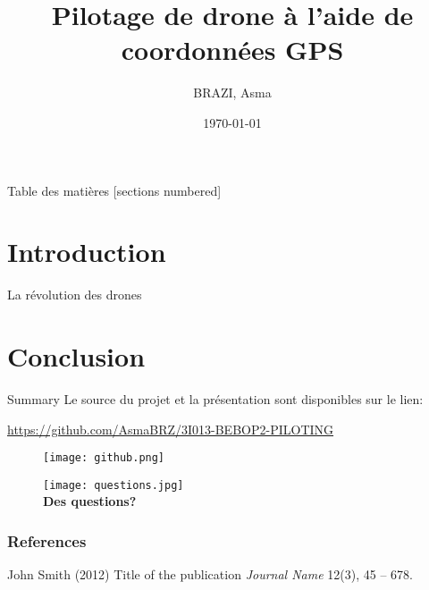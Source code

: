 \documentclass{beamer}
\title{Pilotage de drone à l'aide de coordonnées GPS}
\author{
  BRAZI, Asma\\
 
}
\institute{Sorbonne Université}
\date{\today}
\begin{document}
\maketitle

\begin{frame}{Table des matières}
  [sections numbered]
  \tableofcontents[hideallsubsections]
  
\end{frame}

\section{Introduction}

\begin{frame}[fragile]{La révolution des drones}
\end{frame}


\section{Conclusion}

\begin{frame}{Summary}
  Le source du projet et la présentation sont disponibles sur le lien:
  \begin{center}\url{https://github.com/AsmaBRZ/3I013-BEBOP2-PILOTING}\end{center}
 \begin{center}
 \begin{figure}
 \texttt{[image: github.png]}
 \end{figure}
 \end{center}

\end{frame}
\begin{frame}
\begin{figure}
 \texttt{[image: questions.jpg]}
 \\
 \textbf{Des questions?} 
\end{figure}
\end{frame}
\begin{frame}
\frametitle{References}
\footnotesize{
	\begin{thebibliography}{99} %
		 John Smith (2012)
		\newblock Title of the publication
		\newblock \emph{Journal Name} 12(3), 45 -- 678.
	\end{thebibliography}
}
\end{frame}
\end{document}
